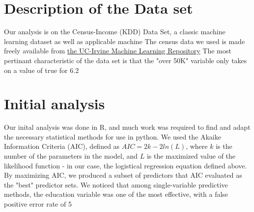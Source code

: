 \documentclass[11pt]{article}
\begin{document}
\section{Description of the Data set}
Our analysis is on the Census-Income (KDD) Data Set, a classic machine learning dataset as well as applicable machine 
The census data we used is made freely available from
\href{http://archive.ics.uci.edu/ml/datasets/Census-Income+%28KDD%29}{the UC-Irvine Machine Learning Repository} 
The most pertinant characteristic of the data set is that the "over 50K" variable only takes on a value of true for 6.2%

\section{Initial analysis}
Our inital analysis was done in R, and much work was required to find and adapt the necessary statistical methods for use in python. 
We used the Akaike Information Criteria (AIC), defined as $AIC = 2k - 2ln(L)$, where $k$ is the number of the parameters in the model, and $L$ is the maximized value of the likelihood function - in our case, the logistical regression equation defined above. By maximizing AIC, we produced a subset of predictors that AIC evaluated as the "best" predictor sets. We noticed that among single-variable predictive methods, the education variable was one of the most effective, with a false positive error rate of 5%
\end{document}
